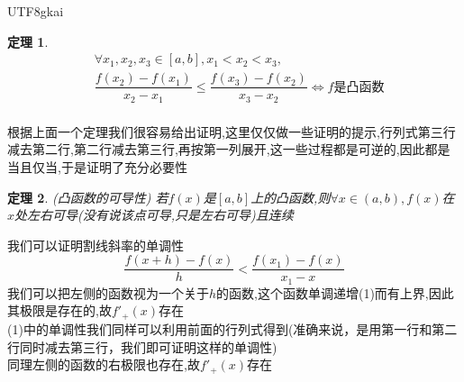 \documentclass{article}
\newtheorem{theorem}{定理}[subsection]
\newenvironment{cproof}{%
\heiti{证明}\kaishu
}{%
}
\begin{document}
\begin{CJK}{UTF8}{gkai}
\begin{center}
  \end{center}
\begin{theorem}
\[
\begin{aligned}    
&\forall x_1,x_2,x_3 \in [a,b],x_1<x_2 < x_3,\\
&\dfrac{f(x_2)-f(x_1)}{x_2-x_1}\leq\dfrac{f(x_3)-f(x_2)}{x_3-x_2} \Leftrightarrow f\text{是凸函数}\\
\end{aligned}
\]
\end{theorem}
根据上面一个定理我们很容易给出证明,这里仅仅做一些证明的提示,行列式第三行减去第二行,第二行减去第三行,再按第一列展开,这一些过程都是可逆的,因此都是当且仅当,于是证明了充分必要性\\

\begin{theorem}(凸函数的可导性)
若$f(x)$是$[a,b]$上的凸函数,则$\forall x\in (a,b),f(x)$在$x$处左右可导(没有说该点可导,只是左右可导)且连续\\
\end{theorem}
\begin{cproof}
我们可以证明割线斜率的单调性
\[\dfrac{f(x+h) - f(x)}{h} < \dfrac{f(x_1) - f(x)}{x_1 - x}\]
我们可以把左侧的函数视为一个关于$h$的函数,这个函数单调递增(1)而有上界,因此其极限是存在的,故$f'_+(x)$存在\\

(1)中的单调性我们同样可以利用前面的行列式得到(准确来说，是用第一行和第二行同时减去第三行，我们即可证明这样的单调性)\\

同理左侧的函数的右极限也存在,故$f'_+(x)$存在\\

\begin{center}
\end{center}
\end{cproof}
\end{CJK}
\end{document}
